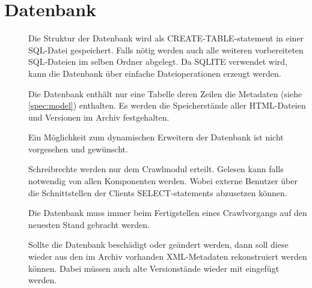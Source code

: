 \section{Datenbank} \label{spec:db}
\begin{description}
	\item []
		Die Struktur der Datenbank wird als CREATE-TABLE-statement in einer SQL-Datei gespeichert.
		Falls nötig werden auch alle weiteren vorbereiteten SQL-Dateien im selben Ordner abgelegt.
		Da SQLITE verwendet wird, kann die Datenbank über einfache Dateioperationen erzeugt werden.
	\item []
		Die Datenbank enthält nur eine Tabelle deren Zeilen die Metadaten 
		(siehe \ref{spec:model}) enthalten. 
		Es werden die Speicherstände aller HTML-Dateien und Versionen im Archiv festgehalten.
	\item [] 
		Ein Möglichkeit zum dynamischen Erweitern der Datenbank ist nicht vorgesehen und gewünscht.
	\item []
		Schreibrechte werden nur dem Crawlmodul erteilt.
		Gelesen kann falls notwendig von allen Komponenten werden.
		Wobei externe Benutzer über die Schnittstellen der Clients SELECT-statements abzusetzen können.
	\item []
		Die Datenbank muss immer beim Fertigstellen eines Crawlvorgangs auf den neuesten Stand gebracht werden.
	\item []
		Sollte die Datenbank beschädigt oder geändert werden, dann soll diese wieder aus den
		im Archiv vorhanden XML-Metadaten rekonstruiert werden können.
		Dabei müssen auch alte Versionstände wieder mit eingefügt werden.
\end{description}
